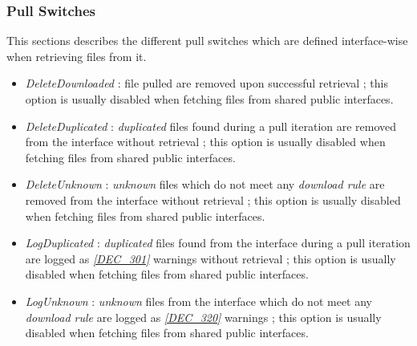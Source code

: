 \documentclass[dec_sum_main.tex]{subfiles}
\begin{document}
\subsubsection{Pull Switches}
This sections describes the different pull switches which are defined interface-wise when retrieving files from it.

\label{DeleteDownloaded}
\label{DeleteUnknownFiles}
\label{DeleteDuplicatedFiles}

\begin{itemize}
	\item \textit{DeleteDownloaded} : file pulled are removed upon successful retrieval ; this option is usually disabled when fetching files from shared public interfaces.
	\item \textit{DeleteDuplicated} : \textit{duplicated} files found during a pull iteration are removed from the interface without retrieval ; this option is usually disabled when fetching files from shared public interfaces.  
	\item \textit{DeleteUnknown} : \textit{unknown} files which do not meet any \textit{download rule} are removed from the interface without retrieval ; this option is usually disabled when fetching files from shared public interfaces.
	\item \textit{LogDuplicated} : \textit{duplicated} files found from the interface during a pull iteration are logged as \hyperref[DEC301]{\textit{[DEC\_301]}} warnings without retrieval ; this option is usually disabled when fetching files from shared public interfaces.
	\item \textit{LogUnknown} : \textit{unknown} files from the interface which do not meet any \textit{download rule} are logged as \hyperref[DEC320]{\textit{[DEC\_320]}} warnings ; this option is usually disabled when fetching files from shared public interfaces.
\end{itemize}


\label{DownloadRules}
\end{document}
